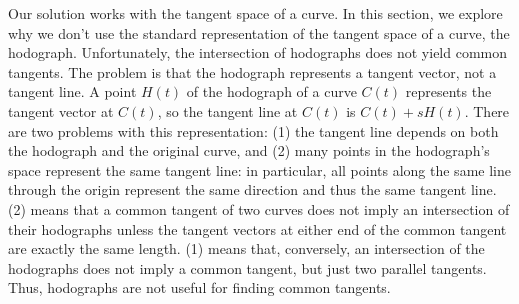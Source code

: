 \documentclass[9pt,twocolumn]{article}
\begin{document}
Our solution works with the tangent space of a curve.
In this section, we explore why we don't use the standard representation of 
the tangent space of a curve, the hodograph.
Unfortunately, the intersection of hodographs does not yield common tangents.
The problem is that the hodograph represents a tangent vector, not a tangent line.
A point $H(t)$ of the hodograph of a curve $C(t)$ represents the tangent 
vector at $C(t)$, so the tangent line at $C(t)$ is $C(t) + sH(t)$.
There are two problems with this representation:
(1) the tangent line depends on both the hodograph and the original curve,
and
(2) many points in the hodograph's space represent the same tangent line:
    in particular, 
    all points along the same line through the origin represent the same
    direction and thus the same tangent line.
(2) means that a common tangent of two curves does not imply an intersection
of their hodographs unless the tangent vectors at either end of the common
tangent are exactly the same length.
(1) means that, conversely, an intersection of the hodographs does not
imply a common tangent, but just two parallel tangents.
Thus, hodographs are not useful for finding common tangents.

\end{document}

